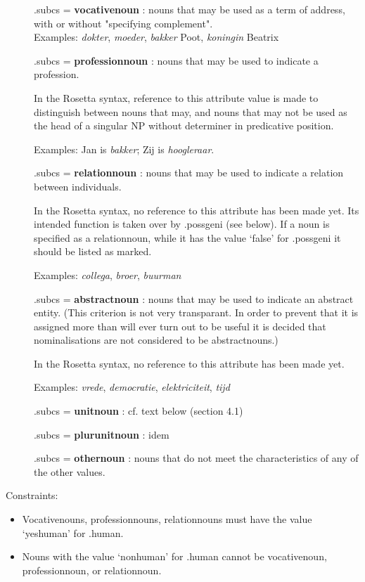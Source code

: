 \begin{description}
\begin{description}
\item[]
.subcs =  {\bf vocativenoun}  : nouns that may be used as a term of address, 
with or
without "specifying complement".\\
Examples: {\em dokter}, {\em moeder}, {\em bakker} Poot, {\em koningin} Beatrix
\item[]
.subcs =  {\bf professionnoun}  : nouns that may be used to indicate a 
profession.

In the Rosetta syntax, reference 
to this attribute value is made to distinguish between 
nouns that may, and nouns that may not be used as the head of a singular NP
without determiner 
in predicative position.

Examples: Jan is {\em bakker}; Zij is {\em hoogleraar}.
\item[]
.subcs =  {\bf relationnoun}  : nouns that may be used to indicate a relation 
between individuals. 

In the Rosetta syntax, no reference to this attribute has been made yet.
Its intended function is taken over by .possgeni (see below). 
If a noun is specified as a relationnoun, while it has the value `false' for
.possgeni it should be listed as marked.

Examples: {\em collega}, {\em broer}, {\em buurman} 
\item[]
.subcs =  {\bf abstractnoun}  : nouns that may be used to indicate an
abstract entity. (This criterion is not very transparant. In order to 
prevent that it is assigned more than will ever turn out to be useful it
is decided that nominalisations are not considered to be abstractnouns.)

In the Rosetta syntax, no reference to this attribute has been made yet.

Examples: {\em vrede}, {\em democratie}, {\em elektriciteit}, {\em tijd}
\item[]
.subcs =  {\bf unitnoun}  : cf. text below (section 4.1)
\item[]
.subcs =  {\bf plurunitnoun} : idem
\item[]
.subcs =  {\bf othernoun}  : nouns that do not meet the
characteristics of any of the other values.
\end{description}


Constraints:
\begin{itemize}
  \item
 Vocativenouns, professionnouns, relationnouns must have the 
value  `yeshuman' for .human.
  \item 
Nouns with the value `nonhuman' for .human  
cannot be vocativenoun, professionnoun, or relationnoun.
\end{itemize}


\end{description}
